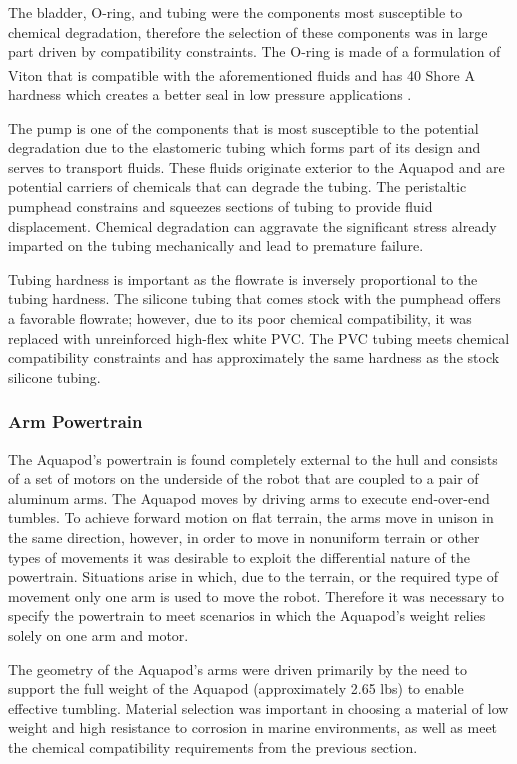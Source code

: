   The bladder, O-ring, and tubing were the components most susceptible to
  chemical degradation, therefore the selection of these components was in
  large part driven by compatibility constraints. The O-ring is made of a
  formulation of Viton\textsuperscript{\textregistered} that is compatible
  with the aforementioned fluids and has 40 Shore A hardness which creates a
  better seal in low pressure applications \cite{Seals2007}.

  The pump is one of the components that is most susceptible to the potential
  degradation due to the elastomeric tubing which forms part of its design and
  serves to transport fluids. These fluids originate exterior to the Aquapod
  and are potential carriers of chemicals that can degrade the tubing. The
  peristaltic pumphead constrains and squeezes sections of tubing to provide
  fluid displacement. Chemical degradation can aggravate the significant
  stress already imparted on the tubing mechanically and lead to premature
  failure.

  Tubing hardness is important as the flowrate is inversely proportional to
  the tubing hardness. The silicone tubing that comes stock with the pumphead
  offers a favorable flowrate; however, due to its poor chemical
  compatibility, it was replaced with unreinforced high-flex white PVC.  The
  PVC tubing meets chemical compatibility constraints and has approximately
  the same hardness as the stock silicone tubing.

  \subsubsection{Arm Powertrain} \label{arm_motors} The Aquapod's powertrain is
  found completely external to the hull and consists of a set of motors on the
  underside of the robot that are coupled to a pair of aluminum arms. The
  Aquapod moves by driving arms to execute end-over-end tumbles. To achieve
  forward motion on flat terrain, the arms move in unison in the same direction,
  however, in order to move in nonuniform terrain or other types of movements it
  was desirable to exploit the differential nature of the powertrain. Situations
  arise in which, due to the terrain, or the required type of movement only one
  arm is used to move the robot.  Therefore it was necessary to specify the
  powertrain to meet scenarios in which the Aquapod's weight relies solely on
  one arm and motor.

    The geometry of the Aquapod's arms were driven primarily by the need to
    support the full weight of the Aquapod (approximately 2.65 lbs) to enable
    effective tumbling. Material selection was important in choosing a material
    of low weight and high resistance to corrosion in marine environments, as
    well as meet the chemical compatibility requirements from the previous
    section.

